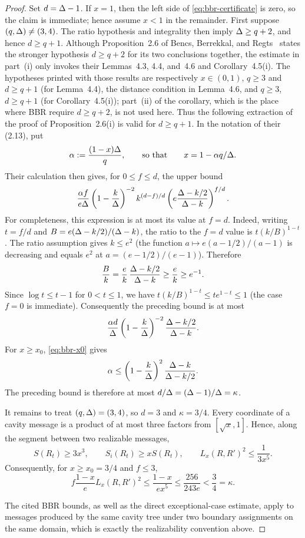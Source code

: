\begin{proof}
Set \(d=\Delta-1\).  If \(x=1\), then the left side of
\eqref{eq:bbr-certificate} is zero, so the claim is immediate; hence assume
\(x<1\) in the remainder.  First suppose \((q,\Delta)\ne(3,4)\).  The ratio
hypothesis and integrality then imply \(\Delta\ge q+2\), and hence
\(d\ge q+1\).  Although Proposition~2.6 of
Bencs, Berrekkal, and Regts~\cite{BencsBerrekkalRegts2025Trees} states the
stronger hypothesis \(d\ge q+2\) for its two conclusions together, the
estimate in part~\textup{(i)} only invokes their Lemmas~4.3, 4.4, and~4.6
and Corollary~4.5\textup{(i)}.  The hypotheses printed with those results
are respectively \(x\in(0,1)\), \(q\ge3\) and \(d\ge q+1\) (for
Lemma~4.4), the distance condition in Lemma~4.6, and \(q\ge3\),
\(d\ge q+1\) (for Corollary~4.5\textup{(i)}); part~\textup{(ii)} of the
corollary, which is the place where BBR require \(d\ge q+2\), is not used
here.  Thus the following extraction of the proof of
Proposition~2.6\textup{(i)} is valid for \(d\ge q+1\).  In the
notation of their (2.13), put
\[
  \alpha:=\frac{(1-x)\Delta}{q},
  \qquad\text{so that}\qquad x=1-\alpha q/\Delta.
\]
Their calculation then gives, for \(0\le f\le d\), the upper bound
\[
 \frac{\alpha f}{e\Delta}
 \left(1-\frac k{\Delta}\right)^{-2}
 k^{(d-f)/d}
 \left(e\frac{\Delta-k/2}{\Delta-k}\right)^{f/d}.
\]
For completeness, this expression is at most its value at \(f=d\).  Indeed,
writing \(t=f/d\) and \(B=e(\Delta-k/2)/(\Delta-k)\), the ratio to the \(f=d\)
value is \(t(k/B)^{1-t}\).  The ratio assumption gives \(k\le e^2\) (the
function \(a\mapsto e(a-1/2)/(a-1)\) is decreasing and equals \(e^2\) at
\(a=(e-1/2)/(e-1)\)).  Therefore
\[
  \frac{B}{k}=\frac{e}{k}\,\frac{\Delta-k/2}{\Delta-k}
  \ge \frac{e}{k}\ge e^{-1}.
\]
Since
\(\log t\le t-1\) for \(0<t\le1\), we have
\(t(k/B)^{1-t}\le t e^{1-t}\le1\) (the case \(f=0\) is immediate).
Consequently the preceding bound is at most
\[
 \frac{\alpha d}{\Delta}
 \left(1-\frac k{\Delta}\right)^{-2}
 \frac{\Delta-k/2}{\Delta-k}.
\]
For \(x\ge x_0\), \eqref{eq:bbr-x0} gives
\[
 \alpha\le
 \left(1-\frac k{\Delta}\right)^2
 \frac{\Delta-k}{\Delta-k/2}.
\]
The preceding bound is therefore at most
\(d/\Delta=(\Delta-1)/\Delta=\kappa\).

It remains to treat \((q,\Delta)=(3,4)\), so \(d=3\) and
\(\kappa=3/4\).  Every coordinate of a cavity message is a product of at
most three factors from \([\sqrt{x},1]\).  Hence, along the segment
between two realizable messages,
\[
 S(R_t)\ge3x^3,
 \qquad
 S_i(R_t)\ge xS(R_t),
 \qquad
 L_x(R,R')^2\le\frac1{3x^5}.
\]
Consequently, for \(x\ge x_0=3/4\) and \(f\le3\),
\[
 f\frac{1-x}{e}L_x(R,R')^2
 \le\frac{1-x}{ex^5}
 \le\frac{256}{243e}<\frac34=\kappa.
\]

The cited BBR bounds, as well as the direct exceptional-case estimate,
apply to messages produced by the same cavity tree under two boundary
assignments on the same domain, which is exactly the realizability
convention above.
\end{proof}

